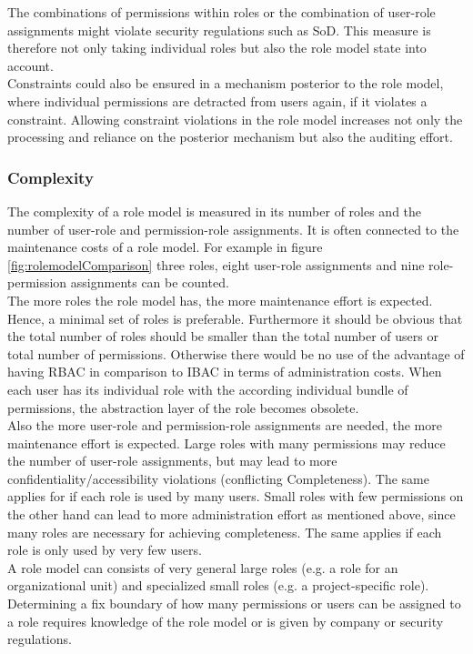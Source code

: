         The combinations of permissions within roles or the combination of user-role assignments might violate security regulations such as SoD. This measure is therefore not only taking individual roles but also the role model state into account.\\
        Constraints could also be ensured in a mechanism posterior to the role model, where individual permissions are detracted from users again, if it violates a constraint. Allowing constraint violations in the role model increases not only the processing and reliance on the posterior mechanism but also the auditing effort.
        \subsubsection{Complexity}
        The complexity of a role model is measured in its number of roles and the number of user-role and permission-role assignments. It is often connected to the maintenance costs of a role model. For example in figure \ref{fig:rolemodelComparison} three roles, eight user-role assignments and nine role-permission assignments can be counted.\\
        The more roles the role model has, the more maintenance effort is expected. Hence, a minimal set of roles is preferable. Furthermore it should be obvious that the total number of roles should be smaller than the total number of users or total number of permissions. Otherwise there would be no use of the advantage of having RBAC in comparison to IBAC in terms of administration costs. When each user has its individual role with the according individual bundle of permissions, the abstraction layer of the role becomes obsolete.\\
        Also the more user-role and permission-role assignments are needed, the more maintenance effort is expected. Large roles with many permissions may reduce the number of user-role assignments, but may lead to more confidentiality/accessibility violations (conflicting Completeness). The same applies for if each role is used by many users. Small roles with few permissions on the other hand can lead to more administration effort as mentioned above, since many roles are necessary for achieving completeness. The same applies if each role is only used by very few users.\\
        A role model can consists of very general large roles (e.g. a role for an organizational unit) and specialized small roles (e.g. a project-specific role). Determining a fix boundary of how many permissions or users can be assigned to a role requires knowledge of the role model or is given by company or security regulations.
